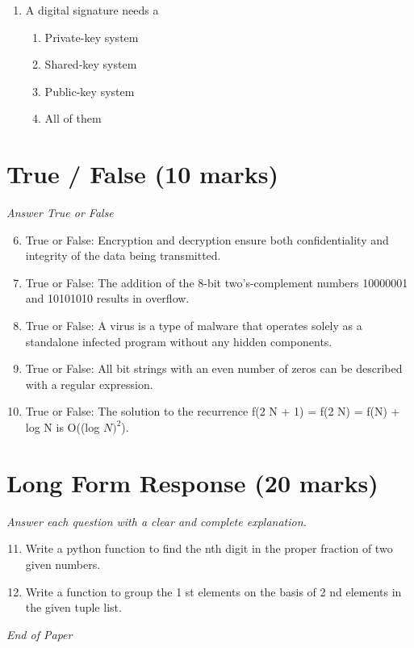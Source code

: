\documentclass[12pt]{article}
\begin{document}
\begin{enumerate}[label=\arabic*.]
\begin{enumerate}[label=(\alph*)]
    \item The file system is likely to be corrupted when a computer crashes
    \item A much higher amount of network traffic results
    \item Caching makes file migration impossible
\end{enumerate}
\item A digital signature needs a
\begin{enumerate}[label=(\alph*)]
    \item Private-key system
    \item Shared-key system
    \item Public-key system
    \item All of them
\end{enumerate}
\end{enumerate}

\section*{True / False (10 marks)}
\textit{Answer True or False}
\begin{enumerate}[label=\arabic*.]
\setcounter{enumi}{5}
\item True or False: Encryption and decryption ensure both confidentiality and integrity of the data being transmitted.
\item True or False: The addition of the 8-bit two's-complement numbers 10000001 and 10101010 results in overflow.
\item True or False: A virus is a type of malware that operates solely as a standalone infected program without any hidden components.
\item True or False: All bit strings with an even number of zeros can be described with a regular expression.
\item True or False: The solution to the recurrence f(2 N + 1) = f(2 N) = f(N) + log N is O((log $N)^2$).
\end{enumerate}

\section*{Long Form Response (20 marks)}
\textit{Answer each question with a clear and complete explanation.}
\begin{enumerate}[label=\arabic*.]
\setcounter{enumi}{10}
\item Write a python function to find the nth digit in the proper fraction of two given numbers.
\item Write a function to group the 1 st elements on the basis of 2 nd elements in the given tuple list.
\end{enumerate}

\vfill
\noindent\textit{End of Paper}
\end{document}
